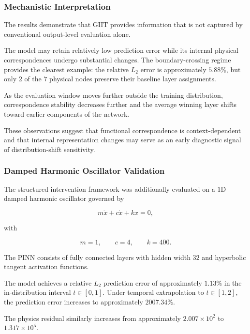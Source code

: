 \documentclass[12pt,singleside,a4paper]{article}
\begin{document}
\subsubsection{Mechanistic Interpretation}

The results demonstrate that GIIT provides information that is not
captured by conventional output-level evaluation alone.

The model may retain relatively low prediction error while its
internal physical correspondences undergo substantial changes. The
boundary-crossing regime provides the clearest example: the relative
$L_2$ error is approximately $5.88\%$, but only $2$ of the $7$ physical
nodes preserve their baseline layer assignments.

As the evaluation window moves further outside the training
distribution, correspondence stability decreases further and the
average winning layer shifts toward earlier components of the network.

These observations suggest that functional correspondence is
context-dependent and that internal representation changes may serve
as an early diagnostic signal of distribution-shift sensitivity.


\subsubsection{Damped Harmonic Oscillator Validation}

The structured intervention framework was additionally evaluated on a
$1$D damped harmonic oscillator governed by

\begin{equation}
    m\ddot{x} + c\dot{x} + kx = 0,
\end{equation}

with

\begin{equation}
    m=1,\qquad c=4,\qquad k=400.
\end{equation}

The PINN consists of fully connected layers with hidden width $32$
and hyperbolic tangent activation functions.

The model achieves a relative $L_2$ prediction error of approximately
$1.13\%$ in the in-distribution interval $t\in[0,1]$. Under temporal
extrapolation to $t\in[1,2]$, the prediction error increases to
approximately $2007.34\%$.

The physics residual similarly increases from approximately
$2.007\times10^2$ to $1.317\times10^5$.
\end{document}
